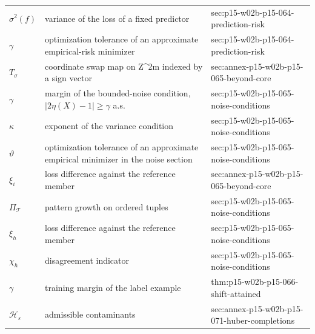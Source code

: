 \begin{longtable}{@{}p{}p{}p{}@{}}
\(\sigma^2(f)\) & variance of the loss of a fixed predictor & sec:\allowbreak{}p15-\allowbreak{}w02b-\allowbreak{}p15-\allowbreak{}064-\allowbreak{}prediction-\allowbreak{}risk \\
\(\gamma\) & optimization tolerance of an approximate empirical-risk minimizer & sec:\allowbreak{}p15-\allowbreak{}w02b-\allowbreak{}p15-\allowbreak{}064-\allowbreak{}prediction-\allowbreak{}risk \\
\(T_\sigma\) & coordinate swap map on Z\^{}{2m} indexed by a sign vector & sec:\allowbreak{}annex-\allowbreak{}p15-\allowbreak{}w02b-\allowbreak{}p15-\allowbreak{}065-\allowbreak{}beyond-\allowbreak{}core \\
\(\gamma\) & margin of the bounded-noise condition, \(|2\eta(X)-1|\geq\gamma\) a.s. & sec:\allowbreak{}p15-\allowbreak{}w02b-\allowbreak{}p15-\allowbreak{}065-\allowbreak{}noise-\allowbreak{}conditions \\
\(\kappa\) & exponent of the variance condition & sec:\allowbreak{}p15-\allowbreak{}w02b-\allowbreak{}p15-\allowbreak{}065-\allowbreak{}noise-\allowbreak{}conditions \\
\(\vartheta\) & optimization tolerance of an approximate empirical minimizer in the noise section & sec:\allowbreak{}p15-\allowbreak{}w02b-\allowbreak{}p15-\allowbreak{}065-\allowbreak{}noise-\allowbreak{}conditions \\
\(\xi_i\) & loss difference against the reference member & sec:\allowbreak{}annex-\allowbreak{}p15-\allowbreak{}w02b-\allowbreak{}p15-\allowbreak{}065-\allowbreak{}beyond-\allowbreak{}core \\
\(\Pi_{\mathcal T}\) & pattern growth on ordered tuples & sec:\allowbreak{}p15-\allowbreak{}w02b-\allowbreak{}p15-\allowbreak{}065-\allowbreak{}noise-\allowbreak{}conditions \\
\(\xi_h\) & loss difference against the reference member & sec:\allowbreak{}p15-\allowbreak{}w02b-\allowbreak{}p15-\allowbreak{}065-\allowbreak{}noise-\allowbreak{}conditions \\
\(\chi_h\) & disagreement indicator & sec:\allowbreak{}p15-\allowbreak{}w02b-\allowbreak{}p15-\allowbreak{}065-\allowbreak{}noise-\allowbreak{}conditions \\
\(\gamma\) & training margin of the label example & thm:\allowbreak{}p15-\allowbreak{}w02b-\allowbreak{}p15-\allowbreak{}066-\allowbreak{}shift-\allowbreak{}attained \\
\(\mathcal H_\varepsilon\) & admissible contaminants & sec:\allowbreak{}annex-\allowbreak{}p15-\allowbreak{}w02b-\allowbreak{}p15-\allowbreak{}071-\allowbreak{}huber-\allowbreak{}completions \\

\end{longtable}
